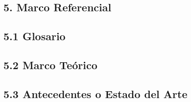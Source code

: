 \begin{doublespace}
\begin{tightcenter}
\section{5. Marco Referencial}
\mylinespacing
\end{tightcenter}

\subsection{5.1 Glosario}

\subsection{5.2 Marco Teórico}

\subsection{5.3 Antecedentes o Estado del Arte}

\mylinespacing
\mylinespacing
\begin{tightcenter}
\end{tightcenter}
\end{doublespace}
